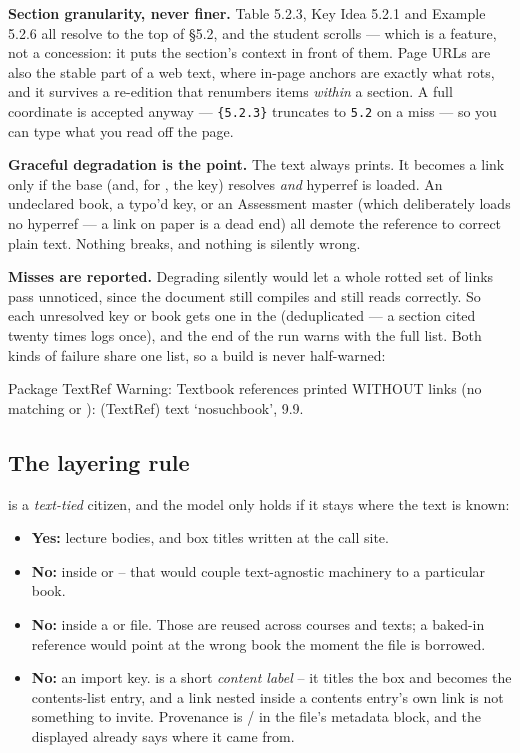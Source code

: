 \textbf{Section granularity, never finer.} Table 5.2.3, Key Idea 5.2.1
and Example 5.2.6 all resolve to the top of \S5.2, and the student
scrolls --- which is a feature, not a concession: it puts the section's
context in front of them. Page URLs are also the stable part of a web
text, where in-page anchors are exactly what rots, and it survives a
re-edition that renumbers items \emph{within} a section. A full
coordinate is accepted anyway --- \texttt{\{5.2.3\}}
truncates to \texttt{5.2} on a miss --- so you can type what you read off
the page.

\textbf{Graceful degradation is the point.} The text always prints. It
becomes a link only if the base (and, for , the key)
resolves \emph{and} hyperref is loaded. An undeclared book, a typo'd key,
or an Assessment master (which deliberately loads no hyperref --- a link
on paper is a dead end) all demote the reference to correct plain text.
Nothing breaks, and nothing is silently wrong.

\textbf{Misses are reported.} Degrading silently would let a whole rotted
set of links pass unnoticed, since the document still compiles and still
reads correctly. So each unresolved key or book gets one 
in the  (deduplicated --- a section cited twenty times logs
once), and the end of the run warns with the full list. Both kinds of
failure share one list, so a build is never half-warned:

\begin{manexsource}
Package TextRef Warning: Textbook references printed WITHOUT links
(no matching \DeclareSection or \DeclareTextBase):
(TextRef)                text `nosuchbook', 9.9.
\end{manexsource}

\subsection*{The layering rule}

 is a \emph{text-tied} citizen, and the model only holds
if it stays where the text is known:

\begin{itemize}
  \item \textbf{Yes:} lecture bodies, and box titles written at the call
    site.
  \item \textbf{No:} inside  or
     -- that would couple text-agnostic machinery to
    a particular book.
  \item \textbf{No:} inside a  or  file.
    Those are reused across courses and texts; a baked-in reference would
    point at the wrong book the moment the file is borrowed.
  \item \textbf{No:} an import key.  is a short \emph{content
    label} -- it titles the box and becomes the contents-list entry, and a
    link nested inside a contents entry's own link is not something to
    invite. Provenance is / in the file's metadata
    block, and the displayed  already says where it came from.
\end{itemize}

